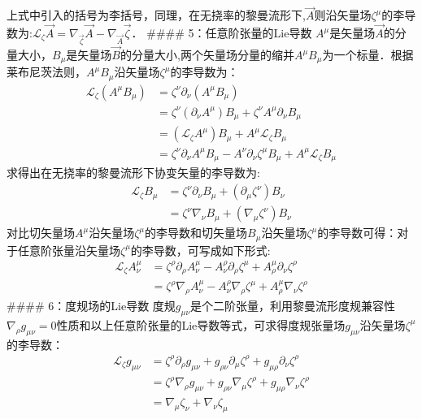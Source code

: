 上式中引入的括号为李括号，同理，在无挠率的黎曼流形下,$\overrightarrow{A}$则沿矢量场$\zeta^{\mu}$的李导数为:$\mathcal{L}_{\zeta} \overrightarrow{A}=\nabla_{\overrightarrow{\zeta}} \overrightarrow{A}-\nabla_{\overrightarrow{A}} \overrightarrow{\zeta}$．
#### 5：任意阶张量的Lie导数
$A^{\mu}$是矢量场$\overrightarrow{A}$的分量大小，$B_{\mu}$是矢量场$\overrightarrow{B}$的分量大小,两个矢量场分量的缩并$A^{\mu}B_{\mu}$为一个标量．根据莱布尼茨法则，$A^{\mu}B_{\mu}$沿矢量场$\zeta^{\mu}$的李导数为：
$$\begin{aligned}
\mathcal{L}_{\zeta}\left(A^{\mu} B_{\mu}\right) &=\zeta^{\nu} \partial_{\nu}\left(A^{\mu} B_{\mu}\right) \\
&=\zeta^{\nu} (\partial_{\nu} A^{\mu}) B_{\mu}+\zeta^{\nu} A^{\mu} \partial_{\nu} B_{\mu} \\
&=(\mathcal{L}_{\zeta} A^{\mu}) B_{\mu}+A^{\mu} \mathcal{L}_{\zeta} B_{\mu} \\
&=\zeta^{\nu} \partial_{\nu} A^{\mu} B_{\mu}-A^{\nu} \partial_{\nu} \zeta^{\mu} B_{\mu}+A^{\mu} \mathcal{L}_{\zeta} B_{\mu }
\end{aligned}$$
求得出在无挠率的黎曼流形下协变矢量的李导数为:
$$\begin{aligned}
\mathcal{L}_{\zeta} B_{\mu} &=\zeta^{\nu} \partial_{\nu} B_{\mu}+(\partial_{\mu} \zeta^{\nu}) B_{\nu} \\
&=\zeta^{\nu} \nabla_{\nu} B_{\mu}+(\nabla_{\mu} \zeta^{\nu}) B_{\nu}
\end{aligned}$$
对比切矢量场$A^{\mu}$沿矢量场$\zeta^{\mu}$的李导数和切矢量场$B_{\mu}$沿矢量场$\zeta^{\mu}$的李导数可得：对于任意阶张量沿矢量场$\zeta^{\mu}$的李导数，可写成如下形式:
$$\begin{aligned}
\mathcal{L}_{\zeta} A_{\nu}^{\mu} &=\zeta^{\rho} \partial_{\rho} A_{\nu}^{\mu}-A_{\nu}^{\rho} \partial_{\rho} \zeta^{\mu}+A_{\rho}^{\mu} \partial_{\nu} \zeta^{\rho} \\
&=\zeta^{\rho} \nabla_{\rho} A_{\nu}^{\mu}-A_{\nu}^{\rho} \nabla_{\rho} \zeta^{\mu}+A_{\rho}^{\mu} \nabla_{\nu} \zeta^{\rho}
\end{aligned}$$
#### 6：度规场的Lie导数
度规$g_{\mu \nu}$是个二阶张量，利用黎曼流形度规兼容性$\nabla_{\rho} g_{\mu \nu}=0$性质和以上任意阶张量的Lie导数等式，可求得度规张量场$g_{\mu \nu}$沿矢量场$\zeta^{\mu}$的李导数：
$$\begin{aligned}
\mathcal{L}_{\zeta} g_{\mu \nu} 
&=\zeta^{\rho} \partial_{\rho} g_{\mu \nu}+g_{\rho \nu} \partial_{\mu} \zeta^{\rho}+g_{\mu \rho} \partial_{\nu} \zeta^{\rho} \\
&=\zeta^{\rho} \nabla_{\rho} g_{\mu \nu}+g_{\rho \nu} \nabla_{\mu} \zeta^{\rho}+g_{\mu \rho} \nabla_{\nu} \zeta^{\rho} \\
&=\nabla_{\mu} \zeta_{\nu}+\nabla_{\nu} \zeta_{\mu} 
\end{aligned}$$

